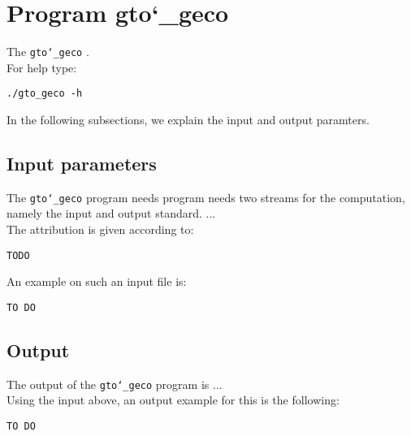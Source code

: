 \section{Program gto\char`_geco}
The \texttt{gto\char`_geco} .\\
For help type:
\begin{lstlisting}
./gto_geco -h
\end{lstlisting}
In the following subsections, we explain the input and output paramters.

\subsection*{Input parameters}

The \texttt{gto\char`_geco} program needs program needs two streams for the computation, namely the input and output standard. ...\\
The attribution is given according to:
\begin{lstlisting}
TODO
\end{lstlisting}
An example on such an input file is:
\begin{lstlisting}
TO DO
\end{lstlisting}

\subsection*{Output}
The output of the \texttt{gto\char`_geco} program is ...\\
Using the input above, an output example for this is the following:
\begin{lstlisting}
TO DO
\end{lstlisting}